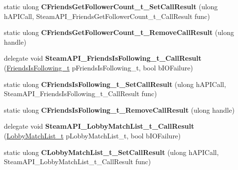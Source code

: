 \begin{DoxyCompactItemize}
static ulong {\bfseries C\+Friends\+Get\+Follower\+Count\+\_\+t\+\_\+\+Set\+Call\+Result} (ulong h\+A\+P\+I\+Call, Steam\+A\+P\+I\+\_\+\+Friends\+Get\+Follower\+Count\+\_\+t\+\_\+\+Call\+Result func)
\item 
\mbox{\label{class_valve_1_1_interop_1_1_native_entrypoints_aadbdc83fafcf6250c7c2c6d87fe6ea38}} 
static ulong {\bfseries C\+Friends\+Get\+Follower\+Count\+\_\+t\+\_\+\+Remove\+Call\+Result} (ulong handle)
\item 
\mbox{\label{class_valve_1_1_interop_1_1_native_entrypoints_a358ce24d2bf05228ee50ed0484b3e8e9}} 
delegate void {\bfseries Steam\+A\+P\+I\+\_\+\+Friends\+Is\+Following\+\_\+t\+\_\+\+Call\+Result} (\hyperlink{struct_valve_1_1_steamworks_1_1_friends_is_following__t}{Friends\+Is\+Following\+\_\+t} p\+Friends\+Is\+Following\+\_\+t, bool b\+I\+O\+Failure)
\item 
\mbox{\label{class_valve_1_1_interop_1_1_native_entrypoints_ad82fcb804d170983f940499c91ae585c}} 
static ulong {\bfseries C\+Friends\+Is\+Following\+\_\+t\+\_\+\+Set\+Call\+Result} (ulong h\+A\+P\+I\+Call, Steam\+A\+P\+I\+\_\+\+Friends\+Is\+Following\+\_\+t\+\_\+\+Call\+Result func)
\item 
\mbox{\label{class_valve_1_1_interop_1_1_native_entrypoints_a89aafd67d332262e54dd8b6b66ae93cd}} 
static ulong {\bfseries C\+Friends\+Is\+Following\+\_\+t\+\_\+\+Remove\+Call\+Result} (ulong handle)
\item 
\mbox{\label{class_valve_1_1_interop_1_1_native_entrypoints_ac7b1044cc15cd5941aca97e29ea494d1}} 
delegate void {\bfseries Steam\+A\+P\+I\+\_\+\+Lobby\+Match\+List\+\_\+t\+\_\+\+Call\+Result} (\hyperlink{struct_valve_1_1_steamworks_1_1_lobby_match_list__t}{Lobby\+Match\+List\+\_\+t} p\+Lobby\+Match\+List\+\_\+t, bool b\+I\+O\+Failure)
\item 
\mbox{\label{class_valve_1_1_interop_1_1_native_entrypoints_a8ebef8d4e9fc2662aeb5beab8dcd774c}} 
static ulong {\bfseries C\+Lobby\+Match\+List\+\_\+t\+\_\+\+Set\+Call\+Result} (ulong h\+A\+P\+I\+Call, Steam\+A\+P\+I\+\_\+\+Lobby\+Match\+List\+\_\+t\+\_\+\+Call\+Result func)

\end{DoxyCompactItemize}
